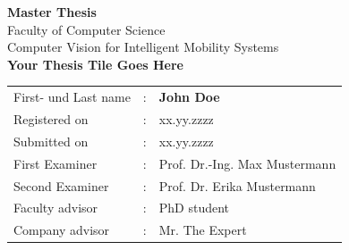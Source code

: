 \begin{titlepage}
	
	\begin{center}	
		\vspace{4cm}
		
		\huge\textbf{
			Master Thesis}\\[2.5em]
		\normalsize
		Faculty of Computer Science\\ Computer Vision for Intelligent Mobility Systems	\\ [7em]
	
		\Large\textbf{Your Thesis Tile Goes Here}	 \\ 

	\end{center}

	\vfill
	
	
	\begin{tabular}{lll}
		First- und Last name &: & \textbf{John Doe}	\\ [3em]
		
		Registered on &:	& xx.yy.zzzz	\\ [1em] %
		Submitted on &:	& xx.yy.zzzz	\\ [3em] %
		
		First Examiner &: 	& Prof. Dr.-Ing. Max Mustermann	\\ [1em]
		Second Examiner &: 	& Prof. Dr. Erika Mustermann	\\[3em]
		
		Faculty advisor &:	& PhD student \\ [1em] %
		Company advisor &:	& Mr. The Expert \\ %
	\end{tabular}
	
\end{titlepage}

\restoregeometry